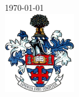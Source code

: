 \begin{titlepage}


{\large \today}\\[3cm] %


\includegraphics[width=0.23\textwidth]{figures/COA}\\[1.0cm] %
 

\vfill %

\end{titlepage}
